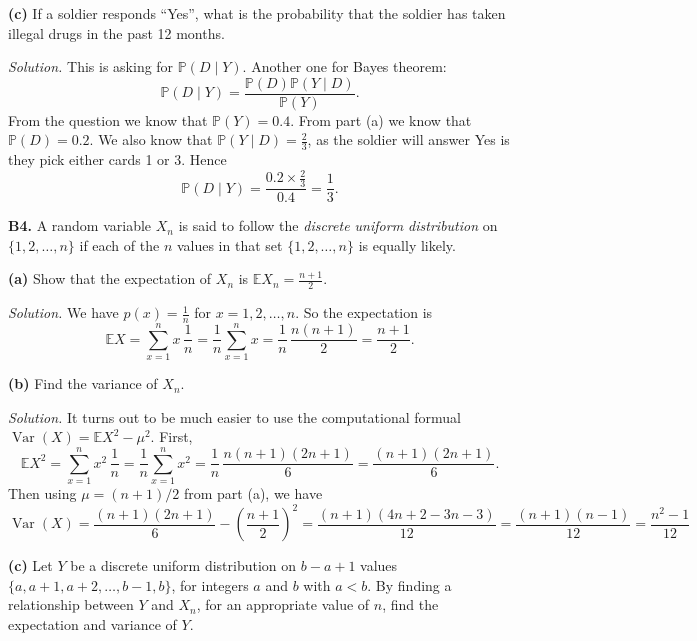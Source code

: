 \documentclass[
  a4paper,
]{book}
\theoremstyle{definition}
\theoremstyle{definition}
\theoremstyle{definition}
\theoremstyle{definition}
\theoremstyle{remark}
\begin{document}
\textbf{(c)} If a soldier responds ``Yes'', what is the probability that the soldier has taken illegal drugs in the past 12 months.

\begin{myanswers}
\emph{Solution.}
This is asking for \(\mathbb P(D \mid Y)\). Another one for Bayes theorem:
\[ \mathbb P(D \mid Y) = \frac{\mathbb P(D) \mathbb P(Y \mid D)}{\mathbb P(Y)} . \]
From the question we know that \(\mathbb P(Y) = 0.4\). From part (a) we know that \(\mathbb P(D) = 0.2\). We also know that \(\mathbb P(Y \mid D) = \frac23\), as the soldier will answer Yes is they pick either cards 1 or 3. Hence
\[ \mathbb P(D \mid Y) = \frac{0.2 \times \frac23}{0.4} = \frac13 . \]

\end{myanswers}

\textbf{B4.} A random variable \(X_n\) is said to follow the \emph{discrete uniform distribution} on \(\{1, 2, \dots, n\}\) if each of the \(n\) values in that set \(\{1,2,\dots,n\}\) is equally likely.

\textbf{(a)} Show that the expectation of \(X_n\) is \(\mathbb EX_n = \displaystyle\frac{n+1}{2}\).

\begin{myanswers}
\emph{Solution.}
We have \(p(x) = \frac1n\) for \(x = 1, 2, \dots, n\). So the expectation is
\[ \mathbb EX = \sum_{x=1}^n x\,\frac{1}{n} = \frac{1}{n} \sum_{x = 1}^n x = \frac{1}{n}\, \frac{n(n+1)}{2} = \frac{n+1}{2} . \]

\end{myanswers}

\textbf{(b)} Find the variance of \(X_n\).

\begin{myanswers}
\emph{Solution.}
It turns out to be much easier to use the computational formual \(\operatorname{Var}(X) = \mathbb EX^2 - \mu^2\). First,
\[ \mathbb EX^2 = \sum_{x=1}^n x^2 \,\frac{1}{n}  = \frac{1}{n} \sum_{x = 1}^n x^2 = \frac{1}{n}\,\frac{n(n+1)(2n+1)}{6} = \frac{(n+1)(2n + 1)}{6} . \]
Then using \(\mu = (n+1)/2\) from part (a), we have
\[ \operatorname{Var}(X) =  \frac{(n+1)(2n + 1)}{6} - \left(\frac{n+1}{2}\right)^2 = \frac{(n+1)(4n + 2 - 3n -3)}{12} = \frac{(n+1)(n-1)}{12} = \frac{n^2 - 1}{12}  \]

\end{myanswers}

\textbf{(c)} Let \(Y\) be a discrete uniform distribution on \(b - a + 1\) values \(\{a, a+1, a+2, \dots, b-1, b\}\), for integers \(a\) and \(b\) with \(a<b\). By finding a relationship between \(Y\) and \(X_n\), for an appropriate value of \(n\), find the expectation and variance of \(Y\).
\end{document}
